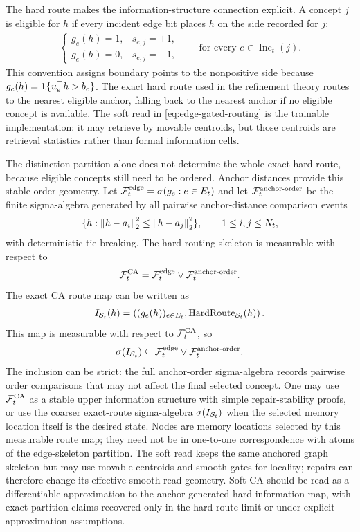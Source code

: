The hard route makes the information-structure connection explicit. A concept $j$ is eligible for $h$ if every incident edge bit places $h$ on the side recorded for $j$:
\begin{align*}
\begin{cases}
g_e(h)=1,& s_{e,j}=+1,\\
g_e(h)=0,& s_{e,j}=-1,
\end{cases}
\qquad\text{for every }e\in \operatorname{Inc}_t(j).
\end{align*}
This convention assigns boundary points to the nonpositive side because $g_e(h)=\mathbf{1}\{u_e^\top h>b_e\}$. The exact hard route used in the refinement theory routes to the nearest eligible anchor, falling back to the nearest anchor if no eligible concept is available. The soft read in \eqref{eq:edge-gated-routing} is the trainable implementation: it may retrieve by movable centroids, but those centroids are retrieval statistics rather than formal information cells.

The distinction partition alone does not determine the whole exact hard route, because eligible concepts still need to be ordered. Anchor distances provide this stable order geometry. Let $\mathcal{F}_t^{\mathrm{edge}}=\sigma(g_e:e\in E_t)$ and let $\mathcal{F}_t^{\mathrm{anchor\text{-}order}}$ be the finite sigma-algebra generated by all pairwise anchor-distance comparison events
\begin{align*}
\{h:\left\lVert h-a_i\right\rVert_2^2\le \left\lVert h-a_j\right\rVert_2^2\},
\qquad 1\le i,j\le N_t,
\end{align*}
with deterministic tie-breaking. The hard routing skeleton is measurable with respect to
\begin{align*}
\mathcal{F}_t^{\mathrm{CA}}=
\mathcal{F}_t^{\mathrm{edge}}\vee \mathcal{F}_t^{\mathrm{anchor\text{-}order}}.
\end{align*}
The exact CA route map can be written as
\begin{align*}
I_{\mathcal{S}_t}(h)
=
\left(
(g_e(h))_{e\in E_t},
\operatorname{HardRoute}_{\mathcal{S}_t}(h)
\right).
\end{align*}
This map is measurable with respect to $\mathcal{F}_t^{\mathrm{CA}}$, so
\begin{align*}
\sigma(I_{\mathcal{S}_t})\subseteq \mathcal{F}_t^{\mathrm{edge}}\vee \mathcal{F}_t^{\mathrm{anchor\text{-}order}}.
\end{align*}
The inclusion can be strict: the full anchor-order sigma-algebra records pairwise order comparisons that may not affect the final selected concept. One may use $\mathcal{F}_t^{\mathrm{CA}}$ as a stable upper information structure with simple repair-stability proofs, or use the coarser exact-route sigma-algebra $\sigma(I_{\mathcal{S}_t})$ when the selected memory location itself is the desired state. Nodes are memory locations selected by this measurable route map; they need not be in one-to-one correspondence with atoms of the edge-skeleton partition. The soft read keeps the same anchored graph skeleton but may use movable centroids and smooth gates for locality; repairs can therefore change its effective smooth read geometry. Soft-CA should be read as a differentiable approximation to the anchor-generated hard information map, with exact partition claims recovered only in the hard-route limit or under explicit approximation assumptions.

